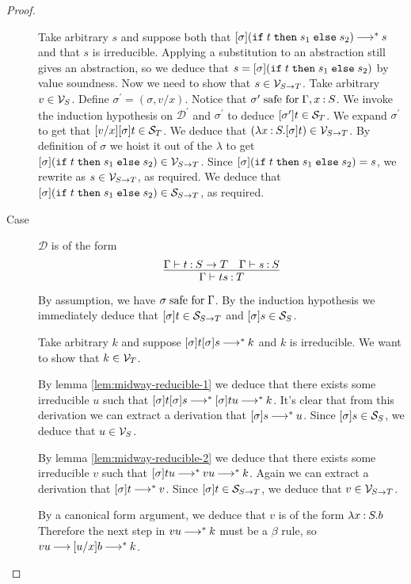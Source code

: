 \documentclass[11pt,letterpaper]{article}
\begin{document}
\begin{proof}
\begin{description}
      Take arbitrary $s$ and suppose both that $[\sigma](\t) \evalto^* s$ and
      that $s$ is irreducible.
      Applying a substitution to an abstraction still gives an abstraction, so
      we deduce that $s = [\sigma](\t)$ by value soundness.
      Now we need to show that $s \in \V_{S \to T}$.
      Take arbitrary $v \in \V_S$.
      Define $\sigma^\prime = (\sigma, v/x)$.
      Notice that $\sigma^\prime \safefor \Gamma, x \hastype S$.
      We invoke the induction hypothesis on $\mathcal{D}^\prime$ and
      $\sigma^\prime$ to deduce $[\sigma^\prime]t \in \S_T$.
      We expand $\sigma^\prime$ to get that $[v/x][\sigma]t \in \S_T$.
      We deduce that $(\lambda x \hastype S. [\sigma]t) \in \V_{S \to T}$.
      By definition of $\sigma$ we hoist it out of the $\lambda$ to get
      $[\sigma](\t) \in \V_{S \to T}$.
      Since $[\sigma](\t) = s$, we rewrite as $s \in \V_{S \to T}$,
      as required.
      We deduce that $[\sigma](\t) \in \S_{S \to T}$, as required.

    \item[Case] $\mathcal{D}$ is of the form
      \begin{equation*}
        \infer{\Gamma \proves t s \hastype T}{
          \Gamma \proves t \hastype S \to T
          &
          \Gamma \proves s \hastype S
        }
      \end{equation*}

      By assumption, we have $\sigma \safefor \Gamma$.
      By the induction hypothesis we immediately deduce that
      $[\sigma]t \in \S_{S \to T}$ and $[\sigma]s \in \S_S$.

      Take arbitrary $k$ and suppose $[\sigma]t [\sigma]s \evalto^* k$ and $k$
      is irreducible.
      We want to show that $k \in \V_T$.

      By lemma \ref{lem:midway-reducible-1} we deduce that there exists some
      irreducible $u$ such that
      $[\sigma]t [\sigma]s \evalto^* [\sigma]t u \evalto^* k$.
      It's clear that from this derivation we can extract a derivation that
      $[\sigma]s \evalto^* u$.
      Since $[\sigma]s \in \S_S$, we deduce that $u \in \V_S$.

      By lemma \ref{lem:midway-reducible-2} we deduce that there exists some
      irreducible $v$ such that
      $[\sigma]t u \evalto^* v u \evalto^* k$.
      Again we can extract a derivation that $[\sigma]t \evalto^* v$.
      Since $[\sigma]t \in \S_{S \to T}$, we deduce that $v \in \V_{S \to T}$.

      By a canonical form argument,
      we deduce that $v$ is of the form $\lambda x \hastype S. b$
      Therefore the next step in $v u \evalto^* k$ must be a $\beta$ rule, so
      $v u \evalto [u/x]b \evalto^* k$.


\end{description}
\end{proof}
\end{document}
